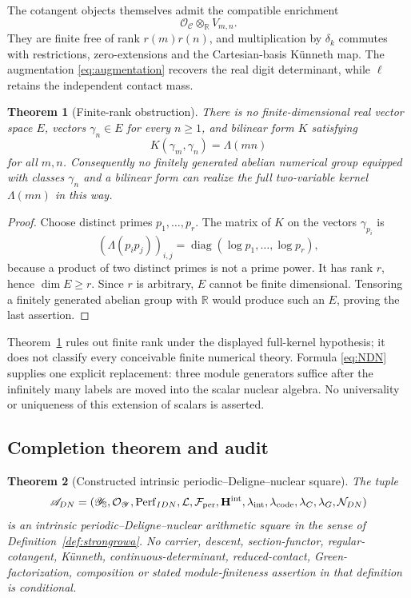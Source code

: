 \documentclass[11pt]{amsart}
\newtheorem{theorem}{Theorem}[section]
\theoremstyle{definition}
\theoremstyle{remark}
\newcommand{\R}{\mathbb R}
\begin{document}
The cotangent objects themselves admit the compatible enrichment
\[
 \mathcal O_{\mathcal C}\otimes_{\R}V_{m,n}.
\]
They are finite free of rank $r(m)r(n)$, and multiplication by $\delta_k$
commutes with restrictions, zero-extensions and the Cartesian-basis
K\"unneth map.  The augmentation \eqref{eq:augmentation} recovers the real
digit determinant, while $\ell$ retains the independent contact mass.

\begin{theorem}[Finite-rank obstruction]\label{thm:finiteNSnogo}
There is no finite-dimensional real vector space $E$, vectors
$\gamma_n\in E$ for every $n\geq1$, and bilinear form $K$ satisfying
\begin{equation}\label{eq:finiteRankImpossible}
 K(\gamma_m,\gamma_n)=\Lambda(mn)
\end{equation}
for all $m,n$.  Consequently no finitely generated abelian numerical group
equipped with classes $\gamma_n$ and a bilinear form can realize the full
two-variable kernel $\Lambda(mn)$ in this way.
\end{theorem}

\begin{proof}
Choose distinct primes $p_1,\ldots,p_r$.  The matrix of $K$ on the vectors
$\gamma_{p_i}$ is
\[
 (\Lambda(p_ip_j))_{i,j}
   =\operatorname{diag}(\log p_1,\ldots,\log p_r),
\]
because a product of two distinct primes is not a prime power.  It has rank
$r$, hence $\dim E\geq r$.  Since $r$ is arbitrary, $E$ cannot be finite
dimensional.  Tensoring a finitely generated abelian group with $\R$ would
produce such an $E$, proving the last assertion.
\end{proof}

Theorem~\ref{thm:finiteNSnogo} rules out finite rank under the displayed
full-kernel hypothesis; it does not classify every conceivable finite
numerical theory.  Formula \eqref{eq:NDN} supplies one explicit replacement:
three module generators suffice after the infinitely many labels are moved
into the scalar nuclear algebra.  No universality or uniqueness of this
extension of scalars is asserted.

\subsection{Completion theorem and audit}

\begin{theorem}[Constructed intrinsic periodic--Deligne--nuclear square]
\label{thm:rowaDN}
The tuple
\begin{equation}\label{eq:ADN}
 \mathscr A_{DN}=
 (\mathscr Y_{\mathbb S},\mathcal O_{\mathscr Y},
  \operatorname{Perf}_{IDN},\mathcal L,\mathcal F_{\rm per},
  \mathbf H^{\rm int},\lambda_{\rm int},\lambda_{\mathrm{code}},
  \lambda_C,\lambda_G,\mathcal N_{DN})
\end{equation}
is an intrinsic periodic--Deligne--nuclear arithmetic square in the sense
of Definition~\ref{def:strongrowa}.  No carrier, descent, section-functor,
regular-cotangent, K\"unneth, continuous-determinant, reduced-contact,
Green-factorization, composition or stated module-finiteness assertion in
that definition is conditional.
\end{theorem}
\end{document}
